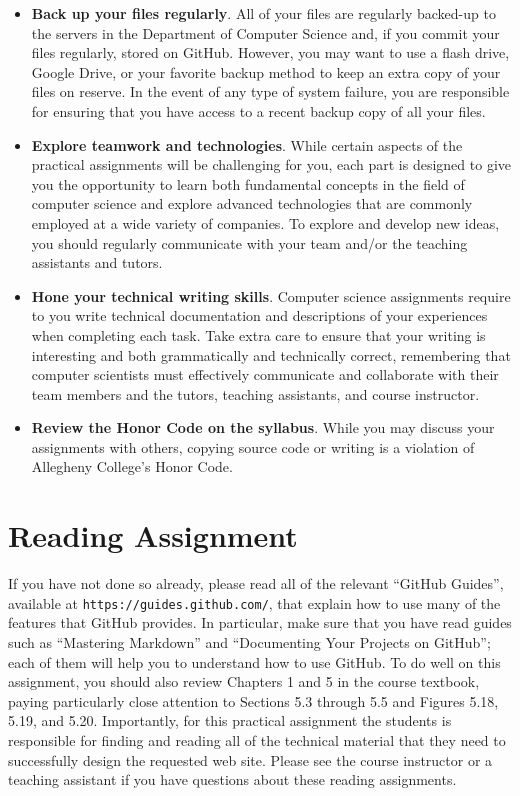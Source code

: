 \documentclass[11pt]{article}
\newcommand{\url}[1]{\lstinline{#1}}
\begin{document}
\begin{itemize}
\item {\bf Back up your files regularly}. All of your files are regularly backed-up to the servers in the Department of
  Computer Science and, if you commit your files regularly, stored on GitHub. However, you may want to use a flash
  drive, Google Drive, or your favorite backup method to keep an extra copy of your files on reserve. In the event of
  any type of system failure, you are responsible for ensuring that you have access to a recent backup copy of all your
  files.

\item {\bf Explore teamwork and technologies}. While certain aspects of the practical assignments will be challenging
  for you, each part is designed to give you the opportunity to learn both fundamental concepts in the field of computer
  science and explore advanced technologies that are commonly employed at a wide variety of companies. To explore and
  develop new ideas, you should regularly communicate with your team and/or the teaching assistants and tutors.

\item {\bf Hone your technical writing skills}. Computer science assignments require to you write technical
  documentation and descriptions of your experiences when completing each task. Take extra care to ensure that your
  writing is interesting and both grammatically and technically correct, remembering that computer scientists must
  effectively communicate and collaborate with their team members and the tutors, teaching assistants, and course
  instructor.

\item {\bf Review the Honor Code on the syllabus}. While you may discuss your
  assignments with others, copying source code or writing is a violation of
  Allegheny College's Honor Code.

\end{itemize}

\section*{Reading Assignment}

If you have not done so already, please read all of the relevant ``GitHub
Guides'', available at \url{https://guides.github.com/}, that explain how to use
many of the features that GitHub provides. In particular, make sure that you
have read guides such as ``Mastering Markdown'' and ``Documenting Your Projects
on GitHub''; each of them will help you to understand how to use GitHub. To do
well on this assignment, you should also review Chapters 1 and 5 in the course
textbook, paying particularly close attention to Sections 5.3 through 5.5 and
Figures 5.18, 5.19, and 5.20. Importantly, for this practical assignment the
students is responsible for finding and reading all of the technical material
that they need to successfully design the requested web site. Please see the
course instructor or a teaching assistant if you have questions about these
reading assignments.
\end{document}
